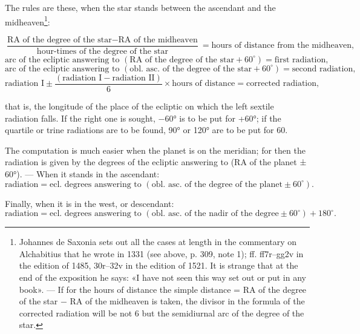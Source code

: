 \documentclass[11pt]{article}
\begin{document}
\par The rules are these, when the star stands between the ascendant and the midheaven\footnote{Johannes de Saxonia sets out all the cases at length in the commentary on Alchabitius that he wrote in 1331 (see above, p. 309, note 1); ff. ff7r–gg2v in the edition of 1485, 30r–32v in the edition of 1521. It is strange that at the end of the exposition he says: «I have not seen this way set out or put in any book». — If for the hours of distance the simple distance = RA of the degree of the star − RA of the midheaven is taken, the divisor in the formula of the corrected radiation will be not 6 but the semidiurnal arc of the degree of the star.}:\par
\par\smallskip\[\dfrac{\text{RA of the degree of the star} - \text{RA of the midheaven}}{\text{hour-times of the degree of the star}} = \text{hours of distance from the midheaven},\]
\[\text{arc of the ecliptic answering to } (\text{RA of the degree of the star} + 60^\circ) = \text{first radiation},\]
\[\text{arc of the ecliptic answering to } (\text{obl. asc. of the degree of the star} + 60^\circ) = \text{second radiation},\]
\[\text{radiation I} \pm \dfrac{(\text{radiation I} - \text{radiation II})}{6} \times \text{hours of distance} = \text{corrected radiation},\]\par\smallskip
\par that is, the longitude of the place of the ecliptic on which the left sextile radiation falls. If the right one is sought, −60° is to be put for +60°; if the quartile or trine radiations are to be found, 90° or 120° are to be put for 60.\par
\par The computation is much easier when the planet is on the meridian; for then the radiation is given by the degrees of the ecliptic answering to (RA of the planet ± 60°). — When it stands in the ascendant: \[ \text{radiation} = \text{ecl. degrees answering to } (\text{obl. asc. of the degree of the planet} \pm 60^\circ). \]\par
\par Finally, when it is in the west, or descendant: \[ \text{radiation} = \text{ecl. degrees answering to } (\text{obl. asc. of the nadir of the degree} \pm 60^\circ) + 180^\circ. \]\par
\end{document}
